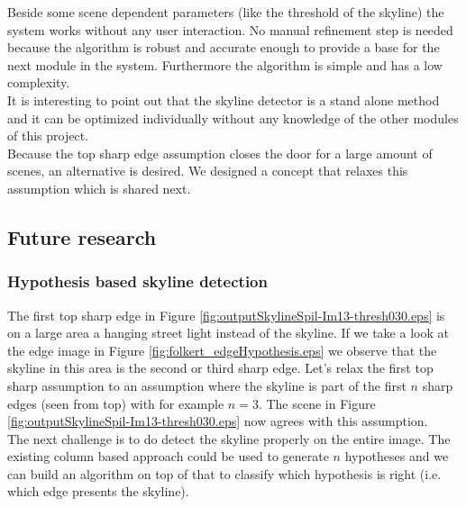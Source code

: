 Beside some scene dependent parameters (like the threshold of the skyline) the
system works without any user interaction. No manual refinement step is needed
because the algorithm is robust and accurate enough to provide a base for the
next module in the system. Furthermore the algorithm is simple and has a low
complexity.\\

It is interesting to point out that the skyline detector is a stand alone method
and it can be optimized individually without any knowledge of the other modules
of this project.\\

Because the top sharp edge assumption closes the door for a large amount of
scenes, an alternative is desired. We designed a concept that relaxes this
assumption which is shared next.

\subsection{Future research}
\label{sec:skylinefut}

\subsubsection{Hypothesis based skyline detection}
The first top sharp edge in Figure \ref{fig:outputSkylineSpil-Im13-thresh030.eps}
is on a large area a hanging street light instead of the skyline.
If we take a look at the edge image in Figure
\ref{fig:folkert_edgeHypothesis.eps} we observe that the skyline in this area is the second or third
sharp edge.
Let's relax the first top sharp assumption to an assumption where the skyline is
part of the first $n$ sharp edges (seen from top) with for example $n=3$.
The scene in Figure \ref{fig:outputSkylineSpil-Im13-thresh030.eps} now agrees with
this assumption.\\
The next challenge is to do detect the skyline properly on the entire image.
The existing column based approach could be used to generate $n$ hypotheses and we can build
an algorithm on top of that to classify which hypothesis is right (i.e. which edge
presents the skyline).


